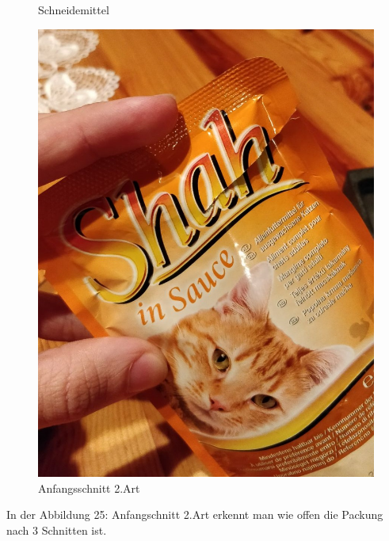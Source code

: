 \documentclass[a4paper,12pt]{scrartcl}
\begin{document}
\begin{figure}[H]
\begin{minipage}[hbt]{.3\linewidth}
      \caption{Schneidemittel}
   \end{minipage}
   \hspace{.4\linewidth}%
   \begin{minipage}[hbt]{.3\linewidth} %
      \includegraphics[width=\linewidth]{Bilder/Schneideversuch_2.Art/Anfangsschnitt}
      \caption{Anfangsschnitt 2.Art}
      \label{Nach 3 Schnitten}
   \end{minipage}
\end{figure}

In der Abbildung 25: Anfangschnitt 2.Art erkennt man wie offen die Packung nach 3 Schnitten ist.
\end{document}
